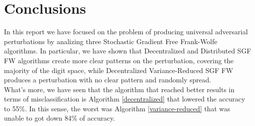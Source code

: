 \section{Conclusions}

In this report we have focused on the problem of producing universal adversarial perturbations by analizing three Stochastic Gradient Free Frank-Wolfe algorithms. In particular, we have shown that Decentralized and Distributed SGF FW algorithms create more clear patterns on the perturbation, covering the majority of the digit space, while Decentralized Variance-Reduced SGF FW produces a perturbation with no clear pattern and randomly spread.\\
\indent What's more, we have seen that the algorithm that reached better results in terms of misclassification is Algorithm \ref{decentralized} that lowered the accuracy to 55\%. In this sense, the worst was Algorithm \ref{variance-reduced} that was unable to got down 84\% of accuracy.\\


